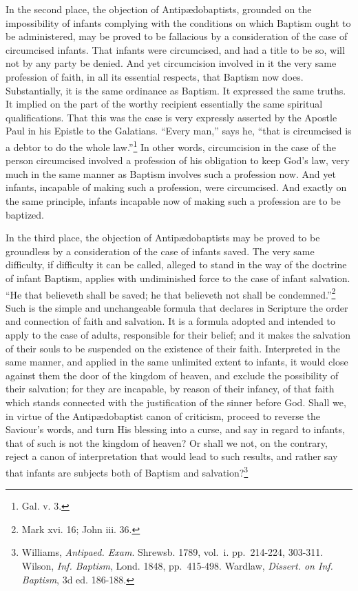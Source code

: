 \documentclass[]{book}
\begin{document}
In the second place, the objection of Antipædobaptists, grounded on the impossibility of infants complying with the conditions on which Baptism ought to be administered, may be proved to be fallacious by a consideration of the case of circumcised infants. That infants were circumcised, and had a title to be so, will not by any party be denied. And yet circumcision involved in it the very same profession of faith, in all its essential respects, that Baptism now does. Substantially, it is the same ordinance as Baptism. It expressed the same truths. It implied on the part of the worthy recipient essentially the same spiritual qualifications. That this was the case is very expressly asserted by the Apostle Paul in his Epistle to the Galatians. ``Every man,'' says he, ``that is circumcised is a debtor to do the whole law.''\footnote{Gal. v. 3.} In other words, circumcision in the case of the person circumcised involved a profession of his obligation to keep God's law, very much in the same manner as Baptism involves such a profession now. And yet infants, incapable of making such a profession, were circumcised. And exactly on the same principle, infants incapable now of making such a profession are to be baptized.

In the third place, the objection of Antipædobaptists may be proved to be groundless by a consideration of the case of infants saved. The very same difficulty, if difficulty it can be called, alleged to stand in the way of the doctrine of infant Baptism, applies with undiminished force to the case of infant salvation. ``He that believeth shall be saved; he that believeth not shall be condemned.''\footnote{Mark xvi. 16; John iii. 36.} Such is the simple and unchangeable formula that declares in Scripture the order and connection of faith and salvation. It is a formula adopted and intended to apply to the case of adults, responsible for their belief; and it makes the salvation of their souls to be suspended on the existence of their faith. Interpreted in the same manner, and applied in the same unlimited extent to infants, it would close against them the door of the kingdom of heaven, and exclude the possibility of their salvation; for they are incapable, by reason of their infancy, of that faith which stands connected with the justification of the sinner before God. Shall we, in virtue of the Antipædobaptist canon of criticism, proceed to reverse the Saviour's words, and turn His blessing into a curse, and say in regard to infants, that of such is not the kingdom of heaven? Or shall we not, on the contrary, reject a canon of interpretation that would lead to such results, and rather say that infants are subjects both of Baptism and salvation?\footnote{Williams, \emph{Antipaed. Exam}. Shrewsb. 1789, vol.~i. pp.~214-224, 303-311. Wilson, \emph{Inf. Baptism}, Lond. 1848, pp.~415-498. Wardlaw, \emph{Dissert. on Inf. Baptism}, 3d ed. 186-188.}
\end{document}
